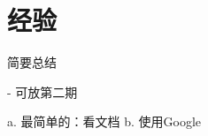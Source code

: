 \documentclass[../main.tex]{subfiles}
\begin{document}
\chapter{经验}
\vspace{-2cm}

简要总结

- 可放第二期


a. 最简单的：看文档
b. 使用Google
\end{document}
